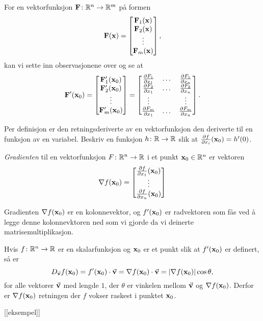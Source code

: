 For en vektorfunksjon $\mathbf{F} \colon \mathbb{R}^n \to \mathbb{R}^m$ på formen
$$\mathbf{F}(\mathbf{x}) = \begin{bmatrix} \mathbf{F}_1(\mathbf{x}) \\ \mathbf{F}_2(\mathbf{x}) \\ \vdots \\ \mathbf{F}_m(\mathbf{x}) \end{bmatrix},$$
kan vi sette inn observasjonene over og se at 
$$\mathbf{F}'(\mathbf{x}_0) = \begin{bmatrix} \mathbf{F}'_1(\mathbf{x}_0) \\ \mathbf{F}'_2(\mathbf{x}_0) \\ \vdots \\ \mathbf{F}'_m(\mathbf{x}_0) \end{bmatrix}
= 
\begin{bmatrix}
  \frac{\partial F_1}{\partial x_1}
  & \dots &
  \frac{\partial F_1}{\partial x_n}
  \\
  \frac{\partial F_2}{\partial x_1}
  & \dots &
  \frac{\partial F_2}{\partial x_n}
  \\
  \vdots &&  \vdots \\
  \frac{\partial F_m}{\partial x_1}
         & \dots&
  \frac{\partial F_m}{\partial x_n}
  \end{bmatrix}.$$
\begin{oppgave}
  Per definisjon er den retningsderiverte av en vektorfunksjon den deriverte til en funksjon av en variabel. 
  Beskriv en funksjon $h \colon \mathbb{R} \to \mathbb{R}$ slik at $\frac{\partial f}{\partial x_i}(\mathbf{x}_0) = h'(0)$.
\end{oppgave}
\begin{definisjon}
  {\em Gradienten} til en vektorfunksjon $F \colon \mathbb{R}^n \to \mathbb{R}$ i et punkt $\mathbf{x}_0 \in \mathbb{R}^n$ er vektoren
  $$\nabla f(\mathbf{x}_0) = \begin{bmatrix}\frac{\partial f}{\partial x_1}(\mathbf{x}_0) \\ \vdots \\ \frac{\partial f}{\partial x_n}(\mathbf{x}_0)\end{bmatrix} $$
\end{definisjon}
\begin{bemerkning}
  Gradienten $\nabla f(\mathbf{x}_0)$ er en kolonnevektor, og $f'(\mathbf{x}_0)$ er
  radvektoren som fås ved å legge denne kolonnevktoren ned som vi gjorde da vi
  deinerte matrisemultiplikasjon.
\end{bemerkning}
\begin{teorem}
  Hvis $f\colon \mathbb{R}^n \to \mathbb{R}$ er en skalarfunksjon og $\mathbf{x}_0$ er et punkt slik
  at $f'(\mathbf{x}_0)$ er definert, så er
  $$D_{\vec{\mathbf{v}}} f(\mathbf{x}_0) = f'(\mathbf{x}_0) \cdot \vec{\mathbf{v}} = \nabla f(\mathbf{x}_0) \cdot
  \vec{\mathbf{v}} = |\nabla f(\mathbf{x}_0)| \cos \theta,$$
  for alle vektorer $\vec{\mathbf{v}}$ med lengde $1$, der $\theta$ er vinkelen mellom $\vec{\mathbf{v}}$ og $\nabla f(\mathbf{x}_0)$.
  Derfor er $\nabla f(\mathbf{x}_0)$ retningen der $f$ vokser raskest i punktet $\mathbf{x}_0$.
\end{teorem}
[[eksempel]]

